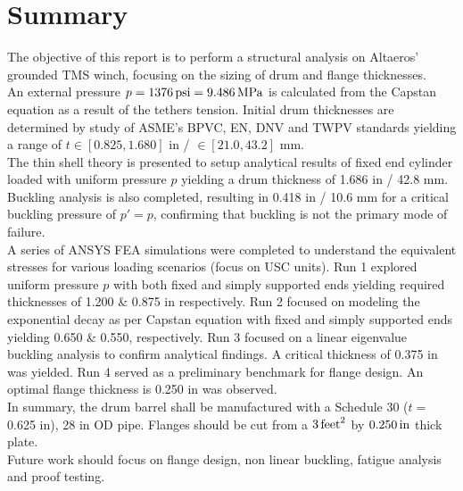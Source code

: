 \chapter{Summary}

The objective of this report is to perform a structural analysis on Altaeros' grounded TMS winch, focusing on the sizing of drum and flange thicknesses.\\

An external pressure $p=1376\,\mathrm{psi}= 9.486\,\mathrm{MPa}$ is calculated from the Capstan equation as a result of the tethers tension. Initial drum thicknesses are determined by study of ASME's BPVC, EN, DNV and TWPV standards yielding a range of $t\in [0.825, 1.680]$ in / $\in [21.0, 43.2]$ mm.\\

The thin shell theory is presented to setup analytical results of fixed end cylinder loaded with uniform pressure $p$ yielding a drum thickness of 1.686 in / 42.8 mm. Buckling analysis is also completed, resulting in 0.418 in / 10.6 mm for a critical buckling pressure of $p'=p$, confirming that buckling is not the primary mode of failure.\\

A series of ANSYS FEA simulations were completed to understand the equivalent stresses for various loading scenarios (focus on USC units). Run 1 explored uniform pressure $p$ with both fixed and simply supported ends yielding required thicknesses of 1.200 \& 0.875 in respectively. Run 2 focused on modeling the exponential decay as per Capstan equation with fixed and simply supported ends yielding 0.650 \& 0.550, respectively. Run 3 focused on a linear eigenvalue buckling analysis to confirm analytical findings. A critical thickness of 0.375 in was yielded. Run 4 served as a preliminary benchmark for flange design. An optimal flange thickness is 0.250 in was observed.\\

In summary, the drum barrel shall be manufactured with a Schedule 30 ($t=$ 0.625 in), 28 in OD pipe. Flanges should be cut from a $3\,\mathrm{feet}^2$ by $0.250\,\mathrm{in}$ thick plate.\\

Future work should focus on flange design, non linear buckling, fatigue analysis and proof testing.